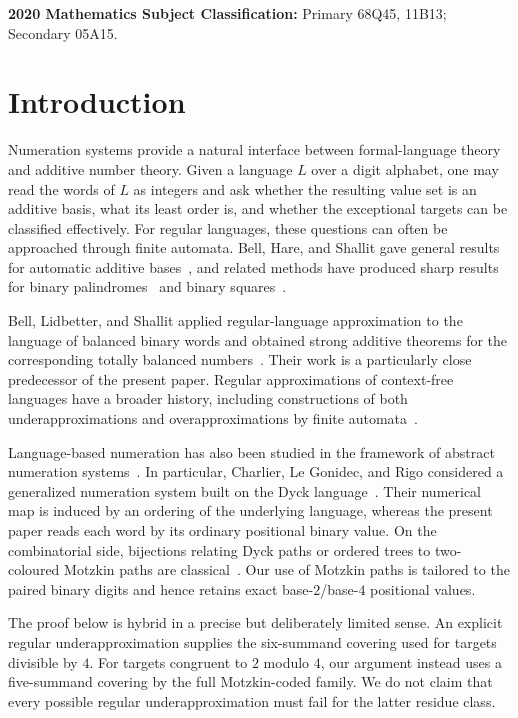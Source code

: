 \documentclass{ws-ijfcs}
\begin{document}
\noindent\textbf{2020 Mathematics Subject Classification:}
Primary 68Q45, 11B13; Secondary 05A15.

\section{Introduction}\label{sec:introduction}

Numeration systems provide a natural interface between formal-language
theory and additive number theory.  Given a language $L$ over a digit
alphabet, one may read the words of $L$ as integers and ask whether the
resulting value set is an additive basis, what its least order is, and
whether the exceptional targets can be classified effectively.  For
regular languages, these questions can often be approached through finite
automata.  Bell, Hare, and Shallit gave general results for automatic
additive bases~\cite{BHS}, and related methods have produced sharp results
for binary palindromes~\cite{RSS} and binary squares~\cite{MNRS}.

Bell, Lidbetter, and Shallit applied regular-language approximation to the
language of balanced binary words and obtained strong additive theorems
for the corresponding totally balanced numbers~\cite{BLS}.  Their work is
a particularly close predecessor of the present paper.  Regular
approximations of context-free languages have a broader history, including
constructions of both underapproximations and overapproximations by finite
automata~\cite{Nederhof,MohriNederhof}.

Language-based numeration has also been studied in the framework of
abstract numeration systems~\cite{RigoNumeration}.  In particular,
Charlier, Le Gonidec, and Rigo considered a generalized numeration system
built on the Dyck language~\cite{CLGR}.  Their numerical map is induced by
an ordering of the underlying language, whereas the present paper reads
each word by its ordinary positional binary value.  On the combinatorial
side, bijections relating Dyck paths or ordered trees to two-coloured
Motzkin paths are classical~\cite{DeutschShapiro}.  Our use of Motzkin
paths is tailored to the paired binary digits and hence retains exact
base-$2$/base-$4$ positional values.

The proof below is hybrid in a precise but deliberately limited sense.  An
explicit regular underapproximation supplies the six-summand covering used
for targets divisible by $4$.  For targets congruent to $2$ modulo $4$, our
argument instead uses a five-summand covering by the full Motzkin-coded
family.  We do not claim that every possible regular underapproximation
must fail for the latter residue class.
\end{document}
